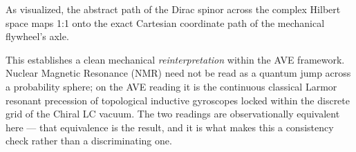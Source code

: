 As visualized, the abstract path of the Dirac spinor across the complex Hilbert space maps 1:1 onto the exact Cartesian coordinate path of the mechanical flywheel's axle. 

This establishes a clean mechanical \emph{reinterpretation} within the AVE framework. Nuclear Magnetic Resonance (NMR) need not be read as a quantum jump across a probability sphere; on the AVE reading it is the continuous classical Larmor resonant precession of topological inductive gyroscopes locked within the discrete grid of the Chiral LC vacuum. The two readings are observationally equivalent here --- that equivalence is the result, and it is what makes this a consistency check rather than a discriminating one.

